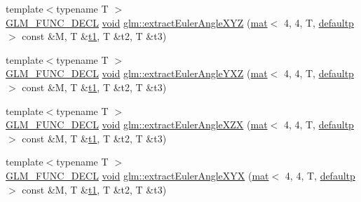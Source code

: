 \begin{DoxyCompactItemize}
\item 
{\footnotesize template$<$typename T $>$ }\\\hyperlink{setup_8hpp_ab2d052de21a70539923e9bcbf6e83a51}{G\+L\+M\+\_\+\+F\+U\+N\+C\+\_\+\+D\+E\+CL} \hyperlink{_s_d_l__opengles2__gl2ext_8h_ae5d8fa23ad07c48bb609509eae494c95}{void} \hyperlink{group__gtx__euler__angles_gacea701562f778c1da4d3a0a1cf091000}{glm\+::extract\+Euler\+Angle\+X\+YZ} (\hyperlink{structglm_1_1mat}{mat}$<$ 4, 4, T, \hyperlink{namespaceglm_a36ed105b07c7746804d7fdc7cc90ff25a9d21ccd8b5a009ec7eb7677befc3bf51}{defaultp} $>$ const \&M, T \&\hyperlink{_s_d_l__opengl__glext_8h_af48031a37b713afa3b0d0d7d29653d7c}{t1}, T \&t2, T \&t3)
\item 
{\footnotesize template$<$typename T $>$ }\\\hyperlink{setup_8hpp_ab2d052de21a70539923e9bcbf6e83a51}{G\+L\+M\+\_\+\+F\+U\+N\+C\+\_\+\+D\+E\+CL} \hyperlink{_s_d_l__opengles2__gl2ext_8h_ae5d8fa23ad07c48bb609509eae494c95}{void} \hyperlink{group__gtx__euler__angles_gaf0937518e63037335a0e8358b6f053c5}{glm\+::extract\+Euler\+Angle\+Y\+XZ} (\hyperlink{structglm_1_1mat}{mat}$<$ 4, 4, T, \hyperlink{namespaceglm_a36ed105b07c7746804d7fdc7cc90ff25a9d21ccd8b5a009ec7eb7677befc3bf51}{defaultp} $>$ const \&M, T \&\hyperlink{_s_d_l__opengl__glext_8h_af48031a37b713afa3b0d0d7d29653d7c}{t1}, T \&t2, T \&t3)
\item 
{\footnotesize template$<$typename T $>$ }\\\hyperlink{setup_8hpp_ab2d052de21a70539923e9bcbf6e83a51}{G\+L\+M\+\_\+\+F\+U\+N\+C\+\_\+\+D\+E\+CL} \hyperlink{_s_d_l__opengles2__gl2ext_8h_ae5d8fa23ad07c48bb609509eae494c95}{void} \hyperlink{group__gtx__euler__angles_gacf0bc6c031f25fa3ee0055b62c8260d0}{glm\+::extract\+Euler\+Angle\+X\+ZX} (\hyperlink{structglm_1_1mat}{mat}$<$ 4, 4, T, \hyperlink{namespaceglm_a36ed105b07c7746804d7fdc7cc90ff25a9d21ccd8b5a009ec7eb7677befc3bf51}{defaultp} $>$ const \&M, T \&\hyperlink{_s_d_l__opengl__glext_8h_af48031a37b713afa3b0d0d7d29653d7c}{t1}, T \&t2, T \&t3)
\item 
{\footnotesize template$<$typename T $>$ }\\\hyperlink{setup_8hpp_ab2d052de21a70539923e9bcbf6e83a51}{G\+L\+M\+\_\+\+F\+U\+N\+C\+\_\+\+D\+E\+CL} \hyperlink{_s_d_l__opengles2__gl2ext_8h_ae5d8fa23ad07c48bb609509eae494c95}{void} \hyperlink{group__gtx__euler__angles_gaf1077a72171d0f3b08f022ab5ff88af7}{glm\+::extract\+Euler\+Angle\+X\+YX} (\hyperlink{structglm_1_1mat}{mat}$<$ 4, 4, T, \hyperlink{namespaceglm_a36ed105b07c7746804d7fdc7cc90ff25a9d21ccd8b5a009ec7eb7677befc3bf51}{defaultp} $>$ const \&M, T \&\hyperlink{_s_d_l__opengl__glext_8h_af48031a37b713afa3b0d0d7d29653d7c}{t1}, T \&t2, T \&t3)

\end{DoxyCompactItemize}
